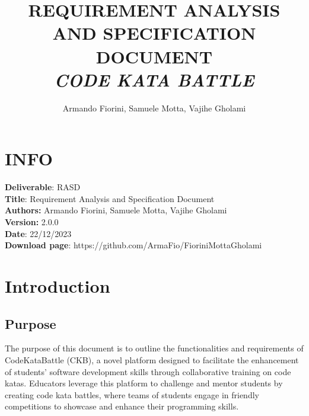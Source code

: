 \documentclass{article}
\title{\textbf{REQUIREMENT ANALYSIS AND SPECIFICATION DOCUMENT}\\\textit{CODE KATA BATTLE}}
\author{Armando Fiorini, Samuele Motta, Vajihe Gholami}
\date{}
\begin{document}
\maketitle
\section*{INFO}
\textbf{Deliverable}: RASD\\
\textbf{Title}: Requirement Analysis and Specification Document\\
\textbf{Authors:} Armando Fiorini, Samuele Motta, Vajihe Gholami\\
\textbf{Version:} 2.0.0\\
\textbf{Date}: 22/12/2023\\
\textbf{Download page}: https://github.com/ArmaFio/FioriniMottaGholami\\
\newpage
\tableofcontents
\newpage


\section{Introduction}
\subsection{Purpose}
The purpose of this document is to outline the functionalities and requirements of CodeKataBattle (CKB), a novel platform designed to facilitate the enhancement of students' software development skills through collaborative training on code katas. Educators leverage this platform to challenge and mentor students by creating code kata battles, where teams of students engage in friendly competitions to showcase and enhance their programming skills.
\end{document}
